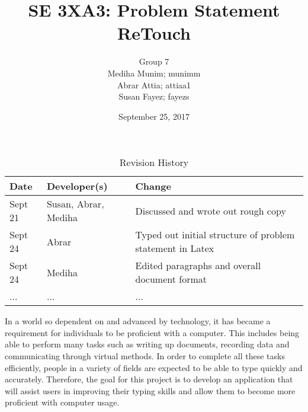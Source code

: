 \documentclass[12pt, oneside]{article}
\title{SE 3XA3: Problem Statement\\ReTouch}
\author{Group 7
		\\ Mediha Munim; munimm
		\\ Abrar Attia; attiaa1
		\\ Susan Fayez; fayezs}
\date{September 25, 2017}
\begin{document}
\begin{table}[hp]
\caption{Revision History} \label{TblRevisionHistory}
\begin{tabularx}{\textwidth}{llX}
\toprule
\textbf{Date} & \textbf{Developer(s)} & \textbf{Change}\\
\midrule
Sept 21 & Susan, Abrar, Mediha & Discussed and wrote out rough copy\\
Sept 24 & Abrar & Typed out initial structure of problem statement in Latex\\
Sept 24 & Mediha & Edited paragraphs and overall document format \\
... & ... & ...\\
\bottomrule
\end{tabularx}
\end{table}

\newpage
\maketitle



In a world so dependent on and advanced by technology, it has became a requirement for individuals to be proficient with a computer. This includes being able to perform many tasks such as writing up documents, recording data and communicating through virtual methods. In order to complete all these tasks efficiently, people in a variety of fields are expected to be able to type quickly and accurately. Therefore, the goal for this project is to develop an application that will assist users in improving their typing skills and allow them to become more proficient with computer usage. 
\\
\end{document}
